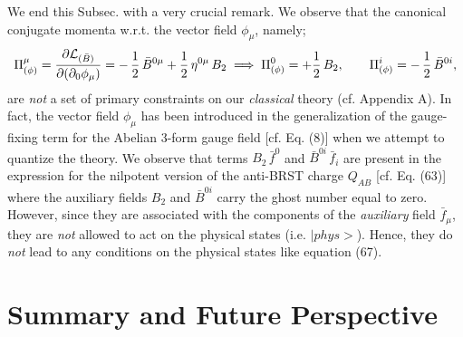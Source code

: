 \documentclass[12pt]{article}
\begin{document}
We end this Subsec. with a very crucial remark. We observe that the canonical conjugate momenta w.r.t. the vector field $\phi_\mu$, namely;
\begin{eqnarray}\label{68}
\Pi^{\mu}_{(\phi)} = \frac {\partial {\cal L}_{(\bar B)}}{\partial (\partial_0 \phi_{\mu})} = -\,
\dfrac{1}{2}\, \bar B^{0\mu} + \dfrac{1}{2}\,  \eta^{0\mu}\, B_2 \;\Longrightarrow\;  \Pi^{0}_{(\phi)}  = + \dfrac{1}{2}\, B_2, \qquad
\Pi^{i}_{(\phi)} = -\, \dfrac{1}{2}\, \bar  B^{0i}, 
\end{eqnarray}
are {\it not} a set of primary constraints on our {\it classical} theory (cf. Appendix A). In fact, the vector field $\phi_\mu$ has been introduced 
in the generalization of the gauge-fixing term
for the Abelian 3-form gauge field [cf. Eq. (8)] when we attempt to quantize the theory. We observe that terms $B_2\, \bar f^0 $ and $\bar B^{0i}\, \bar f_i $
are present in the expression for the nilpotent version of the anti-BRST charge $Q_{AB}$ [cf. Eq. (63)] where the auxiliary fields $B_2$
and $\bar B^{0i}$ carry the ghost number equal to zero. However, since they are associated with the components of the
{\it auxiliary} field $\bar f_\mu$, they are {\it not} allowed to act on the physical states (i.e. $|phys>$). Hence, they
do {\it not} lead to any conditions on the physical states like equation (67).\\


\vskip 1.0cm


\section{Summary and Future Perspective}
\end{document}
